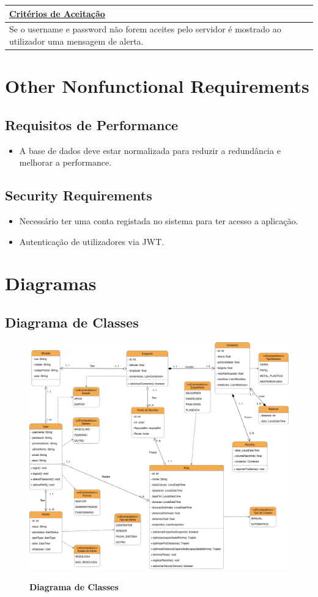 \documentclass{scrreprt}
\begin{document}
    	\begin{tabular}{|p{5.8in}|p{0.7in}|} \hline 
    	\underline{Critérios de Aceitação} \\ \hline 
    	Se o username e password não forem aceites pelo servidor é mostrado ao utilizador uma mensagem de alerta. \\ \hline
    	\end{tabular}\newline\newline

	
	{\let\clearpage\relax \chapter{Other Nonfunctional Requirements}}
	
	\section{Requisitos de Performance}
	\begin{itemize}
		\item A base de dados deve estar normalizada para reduzir a redundância e melhorar a performance.
	\end{itemize}
	
	
	\section{Security Requirements}
	\begin{itemize}
		\item Necessário ter uma conta registada no sistema para ter acesso a aplicação.
		\item Autenticação de utilizadores via JWT.
	\end{itemize}

	{\let\clearpage\relax \chapter{Diagramas}}
		\section{Diagrama de Classes}

	\begin{figure}[H]
		\centering
		\includegraphics[scale=.4]{imagens/class_Diagram.png}
		\par \textbf{Diagrama de Classes}
		\label{fig:classDiagram}
	\end{figure}
\end{document}
